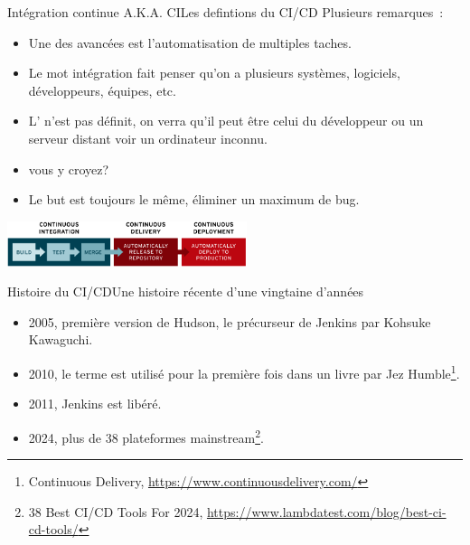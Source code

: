 \documentclass{beamer}
\begin{document}
    \begin{frame}{Intégration continue A.K.A. CI}{Les defintions du CI/CD}
        \transdissolve
        Plusieurs remarques~:
        \begin{itemize}
            \item Une des avancées est l'automatisation de multiples taches.
            \item Le mot intégration fait penser qu'on a plusieurs systèmes, logiciels, développeurs, équipes, etc.
            \item L' n'est pas définit, on verra qu'il peut être celui du développeur ou un serveur distant voir un ordinateur inconnu.
            \item {} vous y croyez?
            \item Le but est toujours le même, éliminer un maximum de bug.
        \end{itemize}
        \bigbreak
        \centering
        \includegraphics[width=7cm]{image/ci-cd-flow}
    \end{frame}

    \begin{frame}{Histoire du CI/CD}{Une histoire récente d'une vingtaine d'années}
        \transdissolve
        \begin{itemize}
            \item 2005, première version de Hudson, le précurseur de Jenkins par Kohsuke Kawaguchi.
            \item 2010, le terme  est utilisé pour la première fois dans un livre par Jez Humble\footnote{\label{ci}Continuous Delivery, \url{https://www.continuousdelivery.com/}}.
            \item 2011, Jenkins est libéré.
            \item 2024, plus de 38 plateformes mainstream\footnote{38 Best CI/CD Tools For 2024, \url{https://www.lambdatest.com/blog/best-ci-cd-tools/}}.
        \end{itemize}
    \end{frame}
\end{document}
